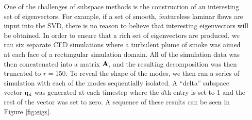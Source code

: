 \documentclass[11pt]{article}
\begin{document}
One of the challenges of subspace methods is the construction of an interesting set of eigenvectors. For example, if a set of smooth, featureless laminar flows are input into the SVD, there is no reason to believe that interesting eigenvectors will be obtained. In order to ensure that a rich set of eigenvectors are produced, we ran six separate CFD simulations where a turbulent plume of smoke was aimed at each face of a rectangular simulation domain. All of the simulation data was then concatenated into a matrix $\mathbf{A}$, and the resulting decomposition was then truncated to $r = 150$. To reveal the shape of the modes, we then ran a series of simulation with each of the modes sequentially isolated. A ``delta'' subspace vector $\mathbf{q}_d$ was generated at each timestep where the $d$th entry is set to 1 and the rest of the vector was set to zero. A sequence of these results can be seen in Figure \ref{fig:eigs}.

\end{document}
